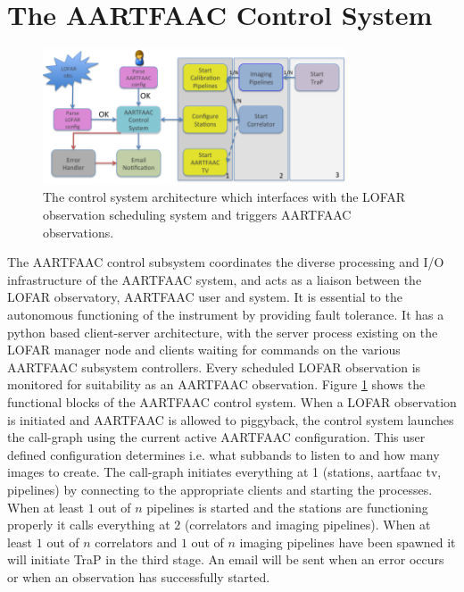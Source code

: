 \documentclass{ws-jai}
\begin{document}
\section {\label{sec:acontrol} The AARTFAAC Control System}
\begin{figure}[htbp]
\centering
\includegraphics[width=0.8\textwidth]{Figs/aartfaac_control_system/Slide1.png}
\caption{The  control  system  architecture  which  interfaces  with  the  LOFAR
  observation scheduling system and triggers AARTFAAC observations.}
\label{fig:afaac_ctrl_sys}
\end{figure}
The  AARTFAAC  control subsystem  coordinates  the  diverse processing  and  I/O
infrastructure of the  AARTFAAC system, and acts as a  liaison between the LOFAR
observatory,  AARTFAAC user  and  system.   It is  essential  to the  autonomous
functioning of  the instrument by  providing fault  tolerance.  It has  a python
based client-server architecture, with the  server process existing on the LOFAR
manager node and clients waiting for  commands on the various AARTFAAC subsystem
controllers. Every scheduled  LOFAR observation is monitored  for suitability as
an AARTFAAC  observation. Figure  \ref{fig:afaac_ctrl_sys} shows  the functional
blocks of  the AARTFAAC control system.   When a LOFAR observation  is initiated
and AARTFAAC is allowed to piggyback, the control system launches the call-graph
using   the  current   active   AARTFAAC  configuration.    This  user   defined
configuration determines i.e. what subbands to  listen to and how many images to
create.   The  call-graph initiates  everything  at  1 (stations,  aartfaac  tv,
pipelines)  by   connecting  to  the   appropriate  clients  and   starting  the
processes. When at  least $1$ out of  $n$ pipelines is started  and the stations
are functioning  properly it  calls everything at  $2$ (correlators  and imaging
pipelines).  When at least $1$ out of $n$ correlators and $1$ out of $n$ imaging
pipelines have been spawned  it will initiate TraP in the  third stage. An email
will  be sent  when an  error  occurs or  when an  observation has  successfully
started.\\
\end{document}
